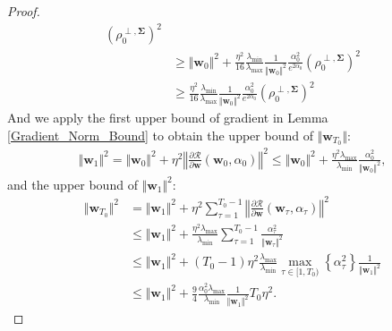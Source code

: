 \documentclass[pdflatex,sn-basic]{sn-jnl}%
\theoremstyle{thmstyleone}%
\begin{document}
\begin{appendices}
\begin{proof}
\begin{equation*}
\begin{aligned}
    \left(
      \rho_0^{\perp, \mathbf{\Sigma}}
    \right)^2
    \\ & \ge 
    \Vert \mathbf{w}_{0} \Vert^2  
    + 
    \frac{\eta^2 }{16}
    \frac{\lambda_{\min} }{\lambda_{\max}}
    \frac{1}{\Vert \mathbf{w}_0 \Vert^2}
    \frac{\alpha_0^2}{e^{2\alpha_0}}
    \left(
      \rho_0^{\perp, \mathbf{\Sigma}}
    \right)^2
    \\ & \ge 
    \frac{\eta^2 }{16}
    \frac{\lambda_{\min} }{\lambda_{\max}}
    \frac{1}{\Vert \mathbf{w}_0 \Vert^2}
    \frac{\alpha_0^2}{e^{2\alpha_0}}
    \left(
      \rho_0^{\perp, \mathbf{\Sigma}}
    \right)^2
  \end{aligned}
  \end{equation*}
  And we apply the first upper bound of gradient in Lemma \ref{Gradient_Norm_Bound} 
  to obtain the upper bound of $\Vert \mathbf{w}_{T_0} \Vert$:
  \begin{equation*}
  \begin{aligned}
    \Vert \mathbf{w}_{1} \Vert^2 
    = 
    \Vert \mathbf{w}_{0} \Vert^2 
    + \eta^2 
    \left\Vert 
        \frac{\partial \mathcal{R}}{\partial \mathbf{w}} \left(\mathbf{w}_0, \alpha_0\right)
    \right\Vert^2
    \le 
    \Vert \mathbf{w}_{0} \Vert^2 
    +
    \frac{\eta^2 \lambda_{\max}}{\lambda_{\min}}
    \frac{\alpha_{0}^2}{\Vert \mathbf{w}_0 \Vert^2},
  \end{aligned}
  \end{equation*}
  and the upper bound of $\Vert \mathbf{w}_{1} \Vert^2$:
  \begin{equation*}
  \begin{aligned}
    \Vert \mathbf{w}_{T_0} \Vert^2 
    & = 
    \Vert \mathbf{w}_{1} \Vert^2 
    + \eta^2 
    \sum_{\tau=1}^{T_0 - 1}
    \left\Vert 
        \frac{\partial \mathcal{R}}{\partial \mathbf{w}} \left(\mathbf{w}_{\tau}, \alpha_{\tau}\right)
    \right\Vert^2
    \\ & \le 
    \Vert \mathbf{w}_{1} \Vert^2 
    + 
    \frac{\eta^2 \lambda_{\max}}{\lambda_{\min}}
    \sum_{\tau=1}^{T_0 - 1}
    \frac{\alpha_{\tau}^2}{\Vert \mathbf{w}_\tau \Vert^2}
    \\ & \le 
    \Vert \mathbf{w}_{1} \Vert^2 
    + 
    \left(T_0 - 1\right) \eta^2 \frac{ \lambda_{\max}}{\lambda_{\min}}
    \max_{\tau \in [1, T_0)} \left\{ \alpha_{\tau}^2 \right\}
    \frac{1}{\Vert \mathbf{w}_{1} \Vert^2}
    \\ & \le 
    \Vert \mathbf{w}_{1} \Vert^2 
    + 
     \frac{9}{4} \frac{ \alpha_{0}^2 \lambda_{\max}}{\lambda_{\min}}
    \frac{1}{\Vert \mathbf{w}_{1} \Vert^2} T_0 \eta^2.
  \end{aligned}
  \end{equation*}


\end{proof}
\end{appendices}
\end{document}
